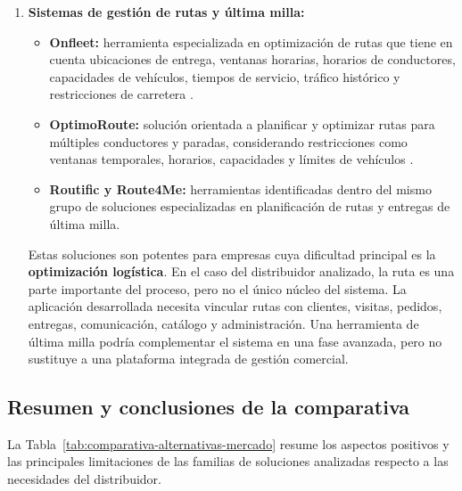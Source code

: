 \begin{enumerate}[label=\textbf{\arabic*.}, leftmargin=1.1cm, itemsep=0.6em, topsep=0.35em]
  \item \textbf{Sistemas de gestión de rutas y última milla:}
  \begin{itemize}[topsep=0.1em, itemsep=0.15em]
    \item \textbf{Onfleet:} herramienta especializada en optimización de rutas que tiene en cuenta ubicaciones de entrega, ventanas horarias, horarios de conductores, capacidades de vehículos, tiempos de servicio, tráfico histórico y restricciones de carretera \citep{onfleet-route-optimization}.
    \item \textbf{OptimoRoute:} solución orientada a planificar y optimizar rutas para múltiples conductores y paradas, considerando restricciones como ventanas temporales, horarios, capacidades y límites de vehículos \citep{optimoroute-features}.
    \item \textbf{Routific y Route4Me:} herramientas identificadas dentro del mismo grupo de soluciones especializadas en planificación de rutas y entregas de última milla.
  \end{itemize}

  Estas soluciones son potentes para empresas cuya dificultad principal es la \textbf{optimización logística}. En el caso del distribuidor analizado, la ruta es una parte importante del proceso, pero no el único núcleo del sistema. La aplicación desarrollada necesita vincular rutas con clientes, visitas, pedidos, entregas, comunicación, catálogo y administración. Una herramienta de última milla podría complementar el sistema en una fase avanzada, pero no sustituye a una plataforma integrada de gestión comercial.
\end{enumerate}

\subsection{Resumen y conclusiones de la comparativa}

La Tabla~\ref{tab:comparativa-alternativas-mercado} resume los aspectos positivos y las principales limitaciones de las familias de soluciones analizadas respecto a las necesidades del distribuidor.

